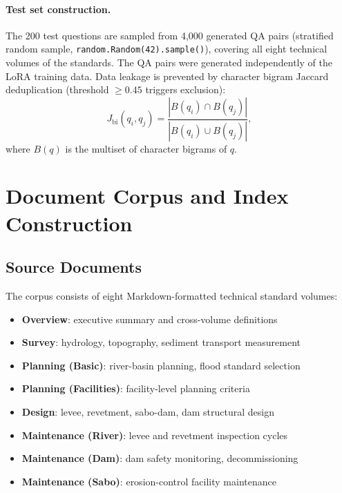 \documentclass[twocolumn]{article}
\begin{document}
\paragraph{Test set construction.}
The 200 test questions are sampled from 4,000 generated QA pairs
(stratified random sample, \texttt{random.Random(42).sample()}),
covering all eight technical volumes of the standards.
The QA pairs were generated independently of the LoRA training data.
Data leakage is prevented by character bigram Jaccard deduplication
(threshold $\geq 0.45$ triggers exclusion):
\begin{equation}
  J_{\mathrm{bi}}(q_i, q_j)
  = \frac{|B(q_i)\cap B(q_j)|}{|B(q_i)\cup B(q_j)|},
  \label{eq:jaccard}
\end{equation}
where $B(q)$ is the multiset of character bigrams of $q$.

\section{Document Corpus and Index Construction}
\label{sec:corpus}

\subsection{Source Documents}

The corpus consists of eight Markdown-formatted technical standard volumes:

\begin{itemize}
  \item \textbf{Overview}: executive summary and cross-volume definitions
  \item \textbf{Survey}: hydrology, topography, sediment transport measurement
  \item \textbf{Planning (Basic)}: river-basin planning, flood standard selection
  \item \textbf{Planning (Facilities)}: facility-level planning criteria
  \item \textbf{Design}: levee, revetment, sabo-dam, dam structural design
  \item \textbf{Maintenance (River)}: levee and revetment inspection cycles
  \item \textbf{Maintenance (Dam)}: dam safety monitoring, decommissioning
  \item \textbf{Maintenance (Sabo)}: erosion-control facility maintenance
\end{itemize}
\end{document}
